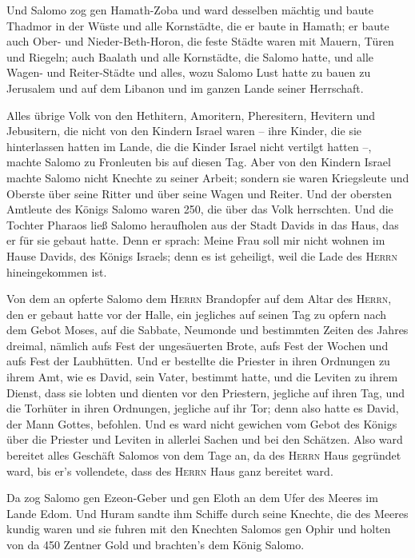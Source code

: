  Und Salomo zog gen Hamath-Zoba und ward desselben mächtig
 und baute Thadmor in der Wüste und alle Kornstädte, die
er baute in Hamath;  er baute auch Ober- und
Nieder-Beth-Horon, die feste Städte waren mit Mauern, Türen und Riegeln;
 auch Baalath und alle Kornstädte, die Salomo hatte, und
alle Wagen- und Reiter-Städte und alles, wozu Salomo Lust hatte zu bauen
zu Jerusalem und auf dem Libanon und im ganzen Lande seiner Herrschaft.

 Alles übrige Volk von den Hethitern, Amoritern,
Pheresitern, Hevitern und Jebusitern, die nicht von den Kindern Israel
waren --  ihre Kinder, die sie hinterlassen hatten im
Lande, die die Kinder Israel nicht vertilgt hatten --, machte Salomo zu
Fronleuten bis auf diesen Tag.  Aber von den Kindern
Israel machte Salomo nicht Knechte zu seiner Arbeit; sondern sie waren
Kriegsleute und Oberste über seine Ritter und über seine Wagen und
Reiter.  Und der obersten Amtleute des Königs Salomo
waren 250, die über das Volk herrschten.  Und die Tochter
Pharaos ließ Salomo heraufholen aus der Stadt Davids in das Haus, das er
für sie gebaut hatte. Denn er sprach: Meine Frau soll mir nicht wohnen
im Hause Davids, des Königs Israels; denn es ist geheiligt, weil die
Lade des \textsc{Herrn} hineingekommen ist.

 Von dem an opferte Salomo dem \textsc{Herrn} Brandopfer
auf dem Altar des \textsc{Herrn}, den er gebaut hatte vor der Halle,
 ein jegliches auf seinen Tag zu opfern nach dem Gebot
Moses, auf die Sabbate, Neumonde und bestimmten Zeiten des Jahres
dreimal, nämlich aufs Fest der ungesäuerten Brote, aufs Fest der Wochen
und aufs Fest der Laubhütten.  Und er bestellte die
Priester in ihren Ordnungen zu ihrem Amt, wie es David, sein Vater,
bestimmt hatte, und die Leviten zu ihrem Dienst, dass sie lobten und
dienten vor den Priestern, jegliche auf ihren Tag, und die Torhüter in
ihren Ordnungen, jegliche auf ihr Tor; denn also hatte es David, der
Mann Gottes, befohlen.  Und es ward nicht gewichen vom
Gebot des Königs über die Priester und Leviten in allerlei Sachen und
bei den Schätzen.  Also ward bereitet alles Geschäft
Salomos von dem Tage an, da des \textsc{Herrn} Haus gegründet ward, bis
er's vollendete, dass des \textsc{Herrn} Haus ganz bereitet ward.

 Da zog Salomo gen Ezeon-Geber und gen Eloth an dem Ufer
des Meeres im Lande Edom.  Und Huram sandte ihm Schiffe
durch seine Knechte, die des Meeres kundig waren und sie fuhren mit den
Knechten Salomos gen Ophir und holten von da 450 Zentner Gold und
brachten's dem König Salomo.

